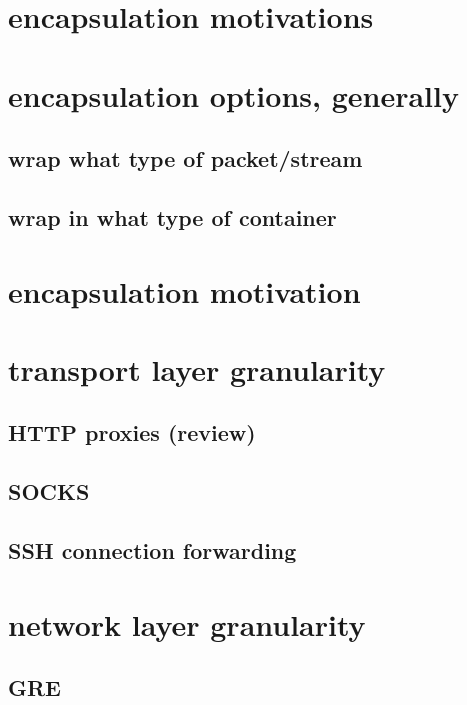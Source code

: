 
\section{encapsulation motivations}



\section{encapsulation options, generally}




\subsection{wrap what type of packet/stream}

\subsection{wrap in what type of container}

\section{encapsulation motivation}

\section{transport layer granularity}

\subsection{HTTP proxies (review)}
\subsection{SOCKS}
\subsection{SSH connection forwarding}

\section{network layer granularity}

\subsection{GRE}
